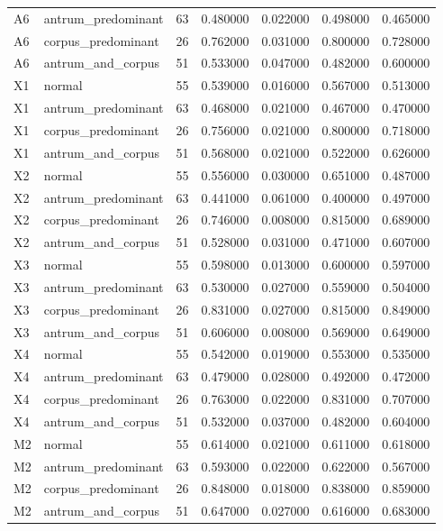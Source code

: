 \begin{table}
\begin{tabular}{llrrrrr}
A6 & antrum\_predominant & 63 & 0.480000 & 0.022000 & 0.498000 & 0.465000 \\
A6 & corpus\_predominant & 26 & 0.762000 & 0.031000 & 0.800000 & 0.728000 \\
A6 & antrum\_and\_corpus & 51 & 0.533000 & 0.047000 & 0.482000 & 0.600000 \\
X1 & normal & 55 & 0.539000 & 0.016000 & 0.567000 & 0.513000 \\
X1 & antrum\_predominant & 63 & 0.468000 & 0.021000 & 0.467000 & 0.470000 \\
X1 & corpus\_predominant & 26 & 0.756000 & 0.021000 & 0.800000 & 0.718000 \\
X1 & antrum\_and\_corpus & 51 & 0.568000 & 0.021000 & 0.522000 & 0.626000 \\
X2 & normal & 55 & 0.556000 & 0.030000 & 0.651000 & 0.487000 \\
X2 & antrum\_predominant & 63 & 0.441000 & 0.061000 & 0.400000 & 0.497000 \\
X2 & corpus\_predominant & 26 & 0.746000 & 0.008000 & 0.815000 & 0.689000 \\
X2 & antrum\_and\_corpus & 51 & 0.528000 & 0.031000 & 0.471000 & 0.607000 \\
X3 & normal & 55 & 0.598000 & 0.013000 & 0.600000 & 0.597000 \\
X3 & antrum\_predominant & 63 & 0.530000 & 0.027000 & 0.559000 & 0.504000 \\
X3 & corpus\_predominant & 26 & 0.831000 & 0.027000 & 0.815000 & 0.849000 \\
X3 & antrum\_and\_corpus & 51 & 0.606000 & 0.008000 & 0.569000 & 0.649000 \\
X4 & normal & 55 & 0.542000 & 0.019000 & 0.553000 & 0.535000 \\
X4 & antrum\_predominant & 63 & 0.479000 & 0.028000 & 0.492000 & 0.472000 \\
X4 & corpus\_predominant & 26 & 0.763000 & 0.022000 & 0.831000 & 0.707000 \\
X4 & antrum\_and\_corpus & 51 & 0.532000 & 0.037000 & 0.482000 & 0.604000 \\
M2 & normal & 55 & 0.614000 & 0.021000 & 0.611000 & 0.618000 \\
M2 & antrum\_predominant & 63 & 0.593000 & 0.022000 & 0.622000 & 0.567000 \\
M2 & corpus\_predominant & 26 & 0.848000 & 0.018000 & 0.838000 & 0.859000 \\
M2 & antrum\_and\_corpus & 51 & 0.647000 & 0.027000 & 0.616000 & 0.683000 \\

\end{tabular}
\end{table}
